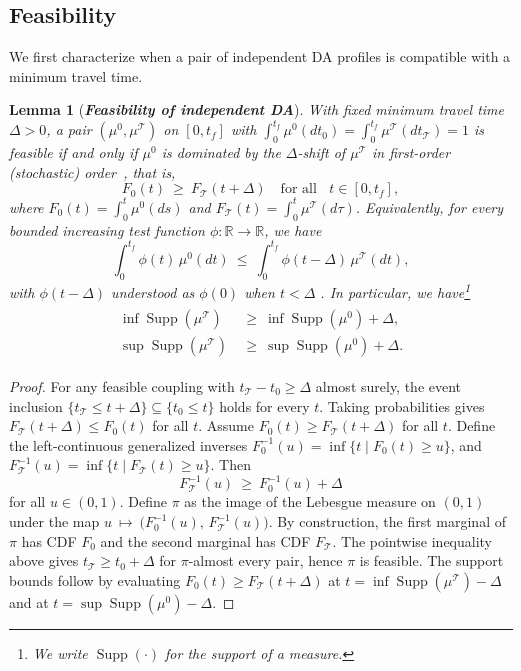 \documentclass[11pt]{article}
\newcommand{\calT}{{\mathcal T}}
\DeclareMathOperator*{\supp}{Supp}
\newtheorem{lemma}{Lemma}
\begin{document}
\subsection{Feasibility}

We first characterize when a pair of independent DA profiles is compatible with a minimum travel time.

\begin{lemma}[\bf \textit{Feasibility of independent DA}]\label{lemma:feasible-order}
With fixed minimum travel time $\Delta>0$, a pair $(\mu^0,\mu^{\calT})$ on $[0,t_f]$ with
$\int_0^{t_f}\mu^0(dt_0)=\int_0^{t_f}\mu^{\calT}(dt_{\calT})=1$
is feasible if and only if $\mu^0$ is dominated by the $\Delta$-shift of $\mu^{\calT}$ in first-order (stochastic) order~\cite[Chapter 1]{shaked2007stochastic}, that is,
\[
F_{0}(t)\ \ge\ F_{\calT}(t+\Delta)\quad\text{for all } \;\; t\in[0,t_f],
\]
where $F_{0}(t)=\int_0^{t}\mu^0(ds)$ and $F_{\calT}(t)=\int_0^{t}\mu^{\calT}(d\tau)$. Equivalently, for every bounded increasing test function $\phi\colon\mathbb R\to\mathbb R$, we have
\[
\int_0^{t_f}\phi(t)\,\mu^0(dt)\ \le\ \int_0^{t_f}\phi(t-\Delta)\,\mu^{\calT}(dt),
\]
with $\phi(t-\Delta)$ understood as $\phi(0)$ when $t<\Delta$ \cite[Eq. 1.A.7]{shaked2007stochastic}. In particular, we have\footnote{We write $\supp(\cdot)$ for the support of a measure.}
\begin{align*}
\begin{aligned}
\inf\supp(\mu^{\calT})\ &\ge\ \inf\supp(\mu^0)+\Delta,\\
\sup\supp(\mu^{\calT})\ &\ge\ \sup\supp(\mu^0)+\Delta.    
\end{aligned}   
\end{align*}
\end{lemma}

\begin{proof}
For any feasible coupling with $t_{\calT}-t_0\ge\Delta$ almost surely, the event inclusion $\{t_{\calT}\le t+\Delta\}\subseteq\{t_0\le t\}$ holds for every $t$. Taking probabilities gives $F_{\calT}(t+\Delta)\le F_{0}(t)$ for all $t$. Assume $F_{0}(t)\ge F_{\calT}(t+\Delta)$ for all $t$. Define the left-continuous generalized inverses $F_{0}^{-1}(u)=\inf\{t\mid F_{0}(t)\ge u\}$, and $F_{\calT}^{-1}(u)=\inf\{t\mid F_{\calT}(t)\ge u\}$. Then 
$$
F_{\calT}^{-1}(u)\ \ge\ F_{0}^{-1}(u)+\Delta
$$
for all $u\in(0,1)$. Define $\pi$ as the image of the Lebesgue measure on $(0,1)$ under the map
$u\ \mapsto\ \big(F_{0}^{-1}(u),\,F_{\calT}^{-1}(u)\big)$.
By construction, the first marginal of $\pi$ has CDF $F_{0}$ and the second marginal has CDF $F_{\calT}$. The pointwise inequality above gives $t_{\calT}\ge t_0+\Delta$ for $\pi$-almost every pair, hence $\pi$ is feasible. The support bounds follow by evaluating $F_{0}(t)\ge F_{\calT}(t+\Delta)$ at $t=\inf\supp(\mu^{\calT})-\Delta$ and at $t=\sup\supp(\mu^{0})-\Delta$.
\end{proof}
\end{document}
